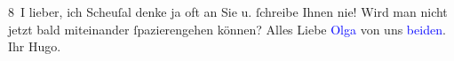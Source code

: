            \pstart
           {\pb}8 I\pend
           \pstart
           lieber, ich Scheuſal denke ja oft an Sie u. ſchreibe Ihnen nie! Wird
               man nicht jetzt bald miteinander ſpazierengehen können?\pend
           \pstart
           Alles Liebe \textcolor{blue}{Olga}{}\ledrightnote{\textcolor{blue}{Olga Schnitzler}} von uns \textcolor{blue}{beiden}{}.\pend
           \pstart Ihr \spacefill\mbox{Hugo.}\pend{}\endnumbering{}  
      